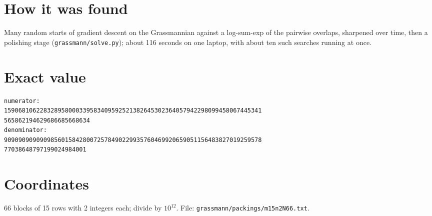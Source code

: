\documentclass[11pt,a4paper]{article}
\begin{document}
\section{How it was found}
Many random starts of gradient descent on the Grassmannian against a log-sum-exp of the pairwise overlaps, sharpened over time, then a polishing stage (\texttt{grassmann/solve.py}); about 116 seconds on one laptop, with about ten such searches running at once.


\appendix
\section{Exact value}
{\small
\begin{verbatim}
numerator:
159068106228328958000339583409592521382645302364057942298099458067445341
565862194629686685668634
denominator:
909090909090985601584280072578490229935760469920659051156483827019259578
77038648797199024984001
\end{verbatim}}

\section{Coordinates}
66 blocks of 15 rows with 2 integers each; divide by $10^{12}$. File: \texttt{grassmann/packings/m15n2N66.txt}.
{\tiny
\begin{multicols}{4}
\end{multicols}}
\end{document}
